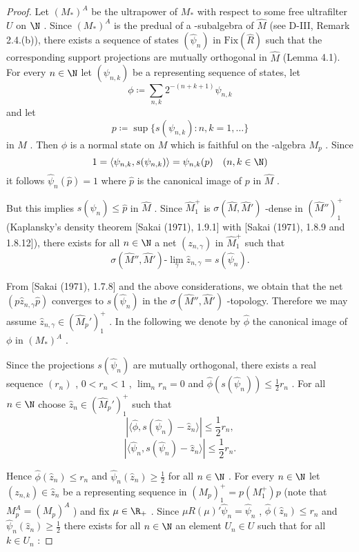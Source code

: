 \begin{proof}
Let $ (M_{*})^{A} $  be the ultrapower of $ M_{*} $  with respect to some free ultrafilter $ U $  on $ \N $ .
Since $ (M_{*})^{A} $  is the predual of a \WA-subalgebra of $ \hat{M} $  (see D-III, Remark 2.4.(b)), there exists a sequence of states $ (\hat{\psi}_{n}) $  in $ \text{Fix}(\hat{R}) $  such that the corresponding support projections are mutually orthogonal in $ \hat{M} $  (Lemma 4.1).
For every $ n \in \N $  let $ (\psi_{n,k}) $  be a representing sequence of states, let
\[
\phi \coloneqq \sum_{n,k} 2^{-(n+k+1)} \psi_{n,k}
\]
and let
\[
p \coloneqq \sup\{s(\psi_{n,k}): n,k=1,\ldots\}
\]
in $ M $ .
Then $ \phi $  is a normal state on $ M $  which is faithful on the \WA-algebra $ M_{p} $ .
Since 
\[
1 = \langle\psi_{n,k},s(\psi_{n,k})\rangle = \psi_{n,k}(p) \quad (n,k \in \N)
\]
it follows $ \hat{\psi}_{n}(\hat{p}) = 1 $  where $ \hat{p} $  is the canonical image of $ p $  in $ \hat{M} $ .

\newpage

But this implies $ s(\hat{\psi}_{n}) \leq \hat{p} $  in $ \hat{M} $ .
Since $ \hat{M}_{1}^{+} $  is $ \sigma(\hat{M},\hat{M}') $ -dense in $ (\hat{M}'')_{1}^{+} $  (Kaplansky's density theorem [Sakai (1971), 1.9.1] with [Sakai (1971), 1.8.9 and 1.8.12]), there exists for all $ n \in \N $  a net $ (z_{n,\gamma}) $  in $ \hat{M}_{1}^{+} $  such that
\[
\sigma(\hat{M}'',\hat{M}')\text{-}\lim_{\gamma} \hat{z}_{n,\gamma} = s(\hat{\psi}_{n}).
\]

From [Sakai (1971), 1.7.8] and the above considerations, we obtain that the net $ (p\hat{z}_{n,\gamma}\hat{p}) $  converges to $ s(\hat{\psi}_{n}) $  in the $ \sigma(\hat{M}'',\hat{M}') $ -topology.
Therefore we may assume $ \hat{z}_{n,\gamma} \in (\hat{M}_{p}')_{1}^{+} $ .
In the following we denote by $ \hat{\phi} $  the canonical image of $ \phi $  in $ (M_{*})^{A} $ .

Since the projections $ s(\hat{\psi}_{n}) $  are mutually orthogonal, there exists a real sequence $ (r_{n}) $ , $ 0 < r_{n} < 1 $ , $ \lim_{n} r_{n} = 0 $  and $ \hat{\phi}(s(\hat{\psi}_{n})) \leq \frac{1}{2}r_{n} $ .
For all $ n \in \N $  choose $ \hat{z}_{n} \in (\hat{M}_{p}')_{1}^{+} $  such that
\[
|\langle\hat{\phi},s(\hat{\psi}_{n}) - \hat{z}_{n}\rangle| \leq \frac{1}{2}r_{n},
\]
\[
|\langle\hat{\psi}_{n},s(\hat{\psi}_{n}) - \hat{z}_{n}\rangle| \leq \frac{1}{2}r_{n}.
\]

Hence $ \hat{\phi}(\hat{z}_{n}) \leq r_{n} $  and $ \hat{\psi}_{n}(\hat{z}_{n}) \geq \frac{1}{2} $  for all $ n \in \N $ .
For every $ n \in \N $  let $ (z_{n,k}) \in \hat{z}_{n} $  be a representing sequence in $ (M_{p})_{1}^{+} = p(M_{1}^{+})p $  (note that $ M_{p}^{A} = (M_{p})^{A} $ ) and fix $ \mu \in \R_{+} $ .
Since $ \mu R(\mu)'\hat{\psi}_{n} = \hat{\psi}_{n} $ , $ \hat{\phi}(\hat{z}_{n}) \leq r_{n} $  and $ \hat{\psi}_{n}(\hat{z}_{n}) \geq \frac{1}{2} $  there exists for all $ n \in \N $  an element $ U_{n} \in U $  such that for all $ k \in U_{n} $ :


\end{proof}
